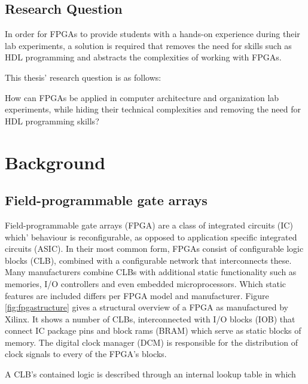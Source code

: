 \documentclass[openright]{template/uva-bachelor-thesis}
\begin{document}
\section{Research Question}

In order for FPGAs to provide students with a hands-on experience during their lab experiments, a solution is required 
that removes the need for skills such as HDL programming and abstracts the complexities of working with FPGAs.

This thesis' research question is as follows: 

\begin{displayquote}
How can FPGAs be applied in computer architecture and organization lab experiments, while hiding their technical complexities and removing the need for HDL programming skills?
\end{displayquote}







\chapter{Background}


\section{Field-programmable gate arrays}
Field-programmable gate arrays (FPGA) are a class of integrated circuits (IC) which' behaviour is reconfigurable, as opposed to application specific integrated circuits (ASIC). In their most common form, FPGAs consist of configurable logic blocks (CLB), combined with a configurable network that interconnects these. Many manufacturers combine CLBs with additional static functionality such as memories, I/O controllers and even embedded microprocessors. Which static features are included differs per FPGA model and manufacturer. Figure \ref{fig:fpgastructure} gives a structural overview of a FPGA as manufactured by Xilinx. It shows a number of CLBs, interconnected with I/O blocks (IOB) that connect IC package pins and block rams (BRAM) which serve as static blocks of memory. The digital clock manager (DCM) is responsible for the distribution of clock signals to every of the FPGA's blocks. 

A CLB's contained logic is described through an internal lookup table in which 
\end{document}
